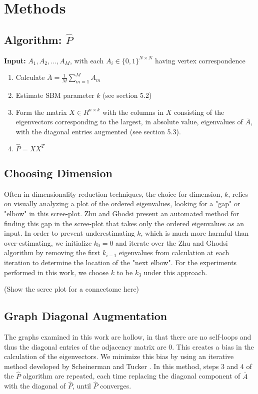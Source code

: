 \section{Methods}
	\subsection{Algorithm: $\hat{P}$}
	\textbf{Input:} $A_1, A_2,..., A_M$, with each $A_i \in \{0,1\}^{N \times N}$ having vertex correspondence
	\begin{enumerate}
		\item Calculate $\bar{A} = \frac{1}{M}\sum\limits_{m = 1}^M A_m$
		\item Estimate SBM parameter $k$ (see section 5.2)
		\item Form the matrix $X \in R^{n \times k}$ with the columns in $X$ consisting of the eigenvectors corresponding to the largest, in absolute value, eigenvalues of $\bar{A}$, with the diagonal entries augmented (see section 5.3).
		\item  $\hat{P} = XX^{T}$
	\end{enumerate}	
	\subsection{Choosing Dimension}
	Often in dimensionality reduction techniques, the choice for dimension, $k$, relies on visually analyzing a plot of the ordered eigenvalues, looking for a "gap" or "elbow" in this scree-plot.  Zhu and Ghodsi \cite{Zhu2006} present an automated method for finding this gap in the scree-plot that takes only the ordered eigenvalues as an input.  In order to prevent underestimating $k$, which is much more harmful than over-estimating, we initialize $k_0 = 0$ and iterate over the Zhu and Ghodsi algorithm by removing the first $k_{i-1}$ eigenvalues from calculation at each iteration to determine the location of the "next elbow".  For the experiments performed in this work, we choose $k$ to be $k_3$ under this approach.
	
	(Show the scree plot for a connectome here)
	
	\subsection{Graph Diagonal Augmentation}
	The graphs examined in this work are hollow, in that there are no self-loops and thus the diagonal entries of the adjacency matrix are 0.  This creates a bias in the calculation of the eigenvectors.  We minimize this bias by using an iterative method developed by Scheinerman and Tucker \cite{Scheinerman2010}. In this method, steps 3 and 4 of the $\hat{P}$ algorithm are repeated, each time replacing the diagonal component of $\bar{A}$ with the diagonal of $\hat{P}$, until $\hat{P}$ converges.
